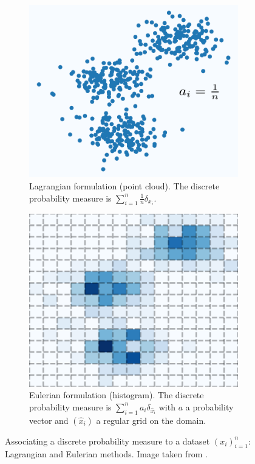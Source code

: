     \label{sec:types-disc}
        \begin{figure}[!h]
            \centering
            \begin{subfigure}[c]{.49\linewidth}
                \centering
                \includegraphics[width=.8\textwidth]{img/disc-lagrangian.png}
                \caption{Lagrangian formulation (point cloud). The discrete probability measure is $\sum_{i=1}^{n}\frac1n\delta_{x_{i}}$.}
            \end{subfigure}
            \hfill
            \begin{subfigure}[c]{.49\linewidth}
                \centering
                \includegraphics[width=.8\textwidth]{img/disc-eulerian.png}
                \caption{Eulerian formulation (histogram). The discrete probability measure is $\sum_{i=1}^{n}a_{i}\delta_{\hat x_{i}}$ with $a$ a probability vector and $(\hat x_{i})$ a regular grid on the domain.}
            \end{subfigure}
            \caption{Associating a discrete probability measure to a dataset $(x_i)_{i=1}^n$: Lagrangian and Eulerian methods. Image taken from \cite{vayer2020contribution}.}
            \label{fig:types-disc}
        \end{figure}

